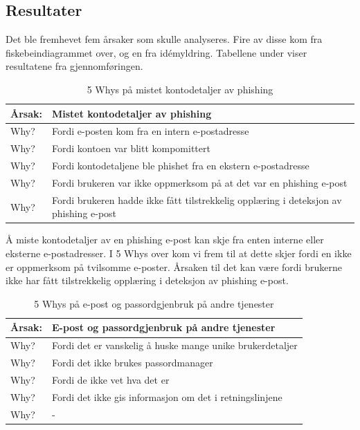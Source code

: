 \subsection{Resultater}
Det ble fremhevet fem årsaker som skulle analyseres. Fire av disse kom fra fiskebeindiagrammet over, og en fra idémyldring. Tabellene under viser resultatene fra gjennomføringen. 

\begin{table} [H]
    \centering
    \begin{tabular}{ | m{5em} | m{30em} | }
        \hline
            \cellcolor{yellow} Årsak: & \cellcolor{yellow} Mistet kontodetaljer av phishing                \\
        \hline
            Why? & Fordi e-posten kom fra en intern e-postadresse                                   \\
        \hline
            Why? & Fordi kontoen var blitt kompomittert                                             \\
        \hline
            Why? & Fordi kontodetaljene ble phishet fra en ekstern e-postadresse                \\
        \hline
            Why? & Fordi brukeren var ikke oppmerksom på at det var en phishing e-post              \\
        \hline
            Why? & Fordi brukeren hadde ikke fått tilstrekkelig opplæring i deteksjon av phishing e-post    \\
        \hline
    \end{tabular}
    \caption[5 Whys: Mistet kontodetaljer av phishing]{5 Whys på mistet kontodetaljer av phishing}
    \label{5Whys-phishing}
\end{table}

Å miste kontodetaljer av en phishing e-post kan skje fra enten interne eller eksterne e-postadresser. I 5 Whys over kom vi frem til at dette skjer fordi en ikke er oppmerksom på tvilsomme e-poster. Årsaken til det kan være fordi brukerne ikke har fått tilstrekkelig opplæring i deteksjon av phishing e-post.

\begin{table} [H]
    \centering
    \begin{tabular}{ | m{5em} | m{30em} | }
        \hline
            \cellcolor{yellow} Årsak: & \cellcolor{yellow} E-post og passordgjenbruk på andre tjenester \\
        \hline
            Why? & Fordi det er vanskelig å huske mange unike brukerdetaljer \\
        \hline
            Why? & Fordi det ikke brukes passordmanager \\
        \hline
            Why? & Fordi de ikke vet hva det er \\
        \hline
            Why? & Fordi det ikke gis informasjon om det i retningslinjene \\
        \hline
            Why? & - \\
        \hline
    \end{tabular}
    \caption[5 Whys: E-post og passordgjenbruk på andre tjenester]{5 Whys på e-post og passordgjenbruk på andre tjenester}
    \label{5Whys-phishing}
\end{table}

